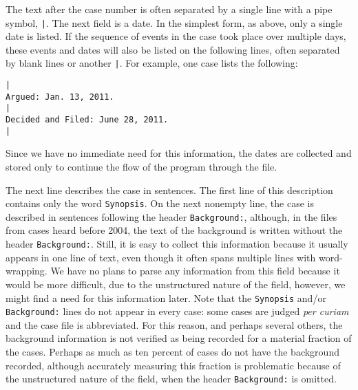 \documentclass[11pt]{paper}
\begin{document}
The text after the case number is often separated by 
a single line with a pipe symbol, \texttt{|}. 
The next field is a date. 
In the simplest form, as above, only a single date is listed. 
If the sequence of events in the case took place over multiple days, 
these events and dates will also be listed on the following lines, 
often separated by blank lines or another \texttt{|}. 
For example, one case lists the following:
% 
\begin{verbatim}
|
Argued: Jan. 13, 2011.
|
Decided and Filed: June 28, 2011.
|
\end{verbatim}
% 
Since we have no immediate need for this information, 
the dates are collected and stored only to continue 
the flow of the program through the file. 

The next line describes the case in sentences. 
The first line of this description contains only the word \texttt{Synopsis}. 
On the next nonempty line, 
the case is described in sentences following the header \texttt{Background:}, 
although, in the files from cases heard before 2004, 
the text of the background is written without the 
header \texttt{Background:}. 
Still, it is easy to collect this information 
because it usually appears in one line of text, 
even though it often spans multiple lines with word-wrapping.
We have no plans to parse any information from this field 
because it would be more difficult, 
due to the unstructured nature of the field, 
however, we might find a need for this information later. 
Note that the \texttt{Synopsis} and/or \texttt{Background:} lines 
do not appear in every case:
some cases are judged \emph{per curiam} and the case file is abbreviated. 
For this reason, and perhaps several others, 
the background information is not verified as being recorded 
for a material fraction of the cases. 
Perhaps as much as ten percent of cases do not have the background recorded, 
although accurately measuring this fraction is problematic 
because of the unstructured nature of the field, 
when the header \texttt{Background:} is omitted. 
\end{document}

